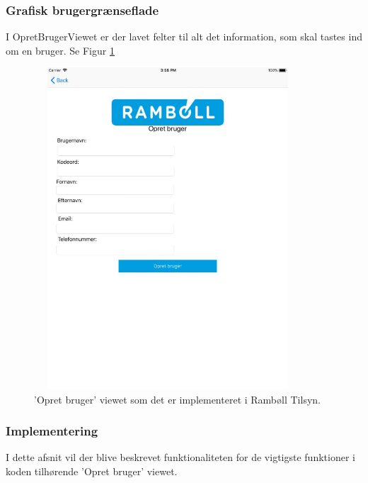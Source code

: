 \subsubsection{Grafisk brugergrænseflade}
I OpretBrugerViewet er der lavet felter til alt det information, som skal tastes ind om en bruger. Se Figur \ref{fig:OpretBrugerView}
\begin{figure}[H] %
	\centering
	\includegraphics[height=12cm, width=10cm]{../ArkitekturDesign/Design/OpretBruger/OpretBrugerView}
	\caption{'Opret bruger' viewet som det er implementeret i Rambøll Tilsyn.}
	\label{fig:OpretBrugerView}
\end{figure}

\clearpage

\subsubsection{Implementering}
I dette afsnit vil der blive beskrevet funktionaliteten for de vigtigste funktioner i koden tilhørende 'Opret bruger' viewet.

